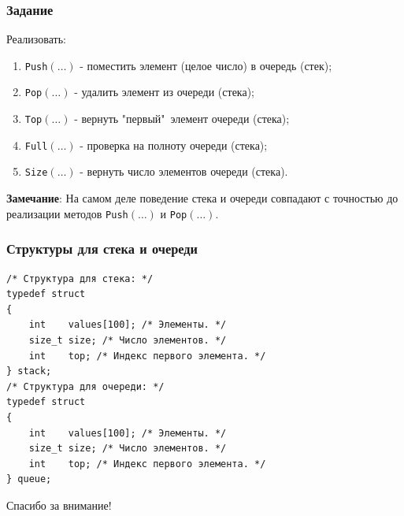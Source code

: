 \documentclass{beamer}
\begin{document}
    \begin{frame}[fragile]
        \frametitle{Задание}
        Реализовать:
        \begin{enumerate}
            \item {\tt Push}$(\dotsc)$ - поместить элемент (целое число) в очередь (стек);
            \item {\tt Pop}$(\dotsc)$ - удалить элемент из очереди (стека);
            \item {\tt Top}$(\dotsc)$ - вернуть "первый"\ элемент очереди (стека);
            \item {\tt Full}$(\dotsc)$ - проверка на полноту очереди (стека);
            \item {\tt Size}$(\dotsc)$ - вернуть число элементов очереди (стека).
        \end{enumerate}
        \vspace{0.5cm}
        \par
        \justifying
        {\bf Замечание}: На самом деле поведение стека и очереди совпадают с точностью до реализации методов  {\tt Push}$(\dotsc)$ и  {\tt Pop}$(\dotsc)$.
    \end{frame}
    \begin{frame}[fragile]
        \frametitle{Структуры для стека и очереди}
        \begin{verbatim}
/* Структура для стека: */
typedef struct
{
    int    values[100]; /* Элементы. */
    size_t size; /* Число элементов. */
    int    top; /* Индекс первого элемента. */ 
} stack;
/* Структура для очереди: */
typedef struct
{
    int    values[100]; /* Элементы. */
    size_t size; /* Число элементов. */
    int    top; /* Индекс первого элемента. */ 
} queue;
        \end{verbatim}
    \end{frame}
    \begin{frame}
        \begin{center}
        \baselineskip 20.0mm
        \Huge Спасибо за внимание!
        \end{center}
    \end{frame}
\end{document}
